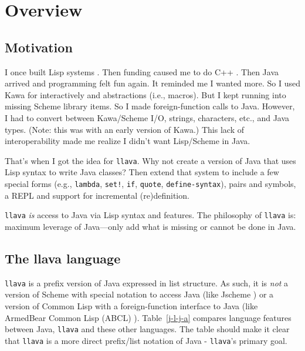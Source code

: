\documentclass{acm-final/sig-alternate-modified}
\begin{document}


\section{Overview}

\subsection{Motivation}

I once built Lisp systems \cite{LaSC5,LaSC3}.  Then funding caused me
to do C++ \cite{DC++}.  Then Java arrived and programming felt fun
again.  It reminded me I wanted more.  So I used Kawa \cite{kawa} for
interactively and abstractions (i.e., macros).  But I kept running
into missing Scheme library items.  So I made foreign-function calls
to Java.  However, I had to convert between Kawa/Scheme I/O, strings,
characters, etc., and Java types.  (Note: this was with an early
version of Kawa.)  This lack of interoperability made me realize I
didn't want Lisp/Scheme in Java.

That's when I got the idea for {\tt llava}.  Why not create a version
of Java that uses Lisp syntax to write Java classes?  Then extend that
system to include a few special forms (e.g., {\tt lambda}, {\tt set!},
{\tt if}, {\tt quote}, {\tt define-syntax}), pairs and symbols, a REPL
and support for incremental (re)definition.

{\tt llava} \emph{is} access to Java via Lisp syntax and features.
The philosophy of {\tt llava} is: maximum leverage of Java---only add
what is missing or cannot be done in Java.

\subsection{The llava language}

{\tt llava} is a prefix version of Java expressed in list structure.
As such, it is \emph{not} a version of Scheme with special notation to
access Java (like Jscheme \cite{jscheme}) or a version of Common Lisp
with a foreign-function interface to Java (like ArmedBear Common Lisp
(ABCL) \cite{abcl}).  Table~\ref{j-l-j-a} compares language features
between Java, {\tt llava} and these other languages.  The table should
make it clear that {\tt llava} is a more direct prefix/list notation
of Java - {\tt llava}'s primary goal.
\end{document}
